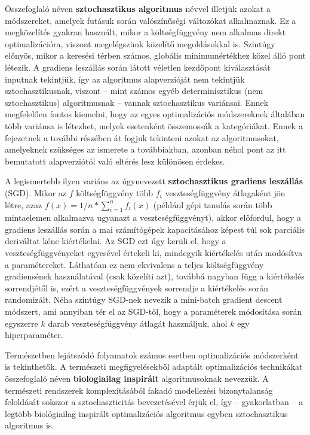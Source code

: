 Összefoglaló néven \textbf{sztochasztikus algoritmus} névvel illetjük azokat a módszereket, amelyek futásuk során valószínűségi változókat alkalmaznak. Ez a megközelítés gyakran használt, mikor a költségfüggvény nem alkalmas direkt optimalizációra, viszont megelégszünk közelítő megoldásokkal is. Szintúgy előnyös, mikor a keresési térben számos, globális minimumértékhez közel álló pont létezik. A gradiens leszállás során látott véletlen kezdőpont kiválasztását inputnak tekintjük, így az algoritmus alapverzióját nem tekintjük sztochasztikusnak, viszont -- mint számos egyéb determinisztikus (nem sztochasztikus) algoritmusnak -- vannak sztochasztikus variánsai. Ennek megfelelően fontos kiemelni, hogy az egyes optimalizációs módszereknek általában több variánsa is létezhet, melyek esetenként összemossák a kategóriákat. Ennek a fejezetnek a további részében át fogjuk tekinteni azokat az algoritmusokat, amelyeknek szükséges az ismerete a továbbiakban, azonban néhol pont az itt bemutatott alapverziótól való eltérés lesz különösen érdekes.


A legismertebb ilyen variáns az úgynevezett \textbf{sztochasztikus gradiens leszállás} (SGD). Mikor az $f$ költségfüggvény több $f_i$ veszteségfüggvény átlagaként jön létre, azaz $f(x) = 1/n * \sum_{i=1}^{n} f_i(x)$ (például gépi tanulás során több mintaelemen alkalmazva ugyanazt a veszteségfüggvényt), akkor előfordul, hogy a gradiens leszállás során a mai számítógépek kapacitásához képest túl sok parciális deriváltat kéne kiértékelni. Az SGD ezt úgy kerüli el, hogy a veszteségfüggvényeket egyesével értekeli ki, mindegyik kiértékelés után modósítva a paramétereket. Láthatóan ez nem ekvivalens a teljes költségfüggvény gradiensének használatával (csak közelíti azt), továbbá nagyban függ a kiértékelés sorrendjétől is, ezért a veszteségfüggvények sorrendje a kiértékelés során randomizált. Néha szintúgy SGD-nek nevezik a mini-batch gradient descent módszert, ami annyiban tér el az SGD-től, hogy a paraméterek módosítása során egyszerre $k$ darab veszteségfüggvény átlagát használjuk, ahol $k$ egy hiperparaméter.


Természetben lejátszódó folyamatok számos esetben optimalizációs módszerként is tekinthetők. A természeti megfigyelésekből adaptált optimalizációs technikákat összefoglaló néven \textbf{biologiailag inspirált} algoritmusoknak nevezzük. A természeti rendszerek komplexitásából fakadó modellezési bizonytalanság feloldását sokszor a sztochaszticitás bevezetésével érjük el, így -- gyakorlatban -- a legtöbb biológiailag inspirált optimalizációs algoritmus egyben sztochasztikus algoritmus is.


